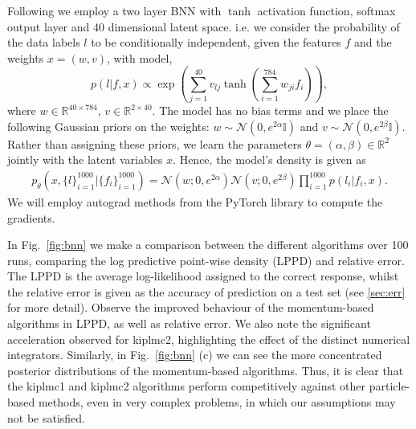 Following \citep{kuntz2023particle} we employ a two layer BNN with $\tanh$ activation function, softmax output layer and 40 dimensional latent space. i.e. we consider the probability of the data labels $l$ to be conditionally independent, given the features $f$ and the weights $x=(w,v)$, with model,
\begin{equation*}
p(l|f, x) \propto \exp\left(\sum_{j=1}^{40} v_{lj} \tanh\left(\sum_{i=1}^{784} w_{ji} f_i\right)\right),    
\end{equation*}
where $w\in \mathbb{R}^{40\times 784}$, $v\in\mathbb{R}^{2\times 40}$. The model has no bias terms and we place the following Gaussian priors on the weights: $w\sim \mathcal{N}(0, e^{2\alpha}\mathbb{I})$ and $v\sim \mathcal{N}(0, e^{2\beta}\mathbb{I})$. Rather than assigning these priors, we learn the parameters $\theta=(\alpha, \beta)\in\mathbb{R}^2$ jointly with the latent variables $x$. Hence, the model's density is given as
\small
\begin{align*}
p_\theta(x, \{l\}_{i=1}^{1000} |\{f_i\}_{i=1}^{1000})= \mathcal{N}(w; 0,e^{2\alpha}) \mathcal{N}(v; 0, e^{2\beta})\prod_{i=1}^{1000} p(l_i|f_i, x).
\end{align*}
\normalsize
We will employ autograd methods from the PyTorch library to compute the gradients.

In Fig.~\ref{fig:bnn} we make a comparison between the different algorithms over 100 runs, comparing the log predictive point-wise density (LPPD) and relative error. The LPPD is the average log-likelihood assigned to the correct response, whilst the relative error is given as the accuracy of prediction on a test set (see \ref{sec:err} for more detail). Observe the improved behaviour of the momentum-based algorithms in LPPD, as well as relative error. We also note the significant acceleration observed for \gls*{kiplmc2}, highlighting the effect of the distinct numerical integrators. Similarly, in Fig.~\ref{fig:bnn} (c) we can see the more concentrated posterior distributions of the momentum-based algorithms. Thus, it is clear that the \gls*{kiplmc1} and \gls*{kiplmc2} algorithms perform competitively against other particle-based methods, even in very complex problems, in which our assumptions may not be satisfied.

